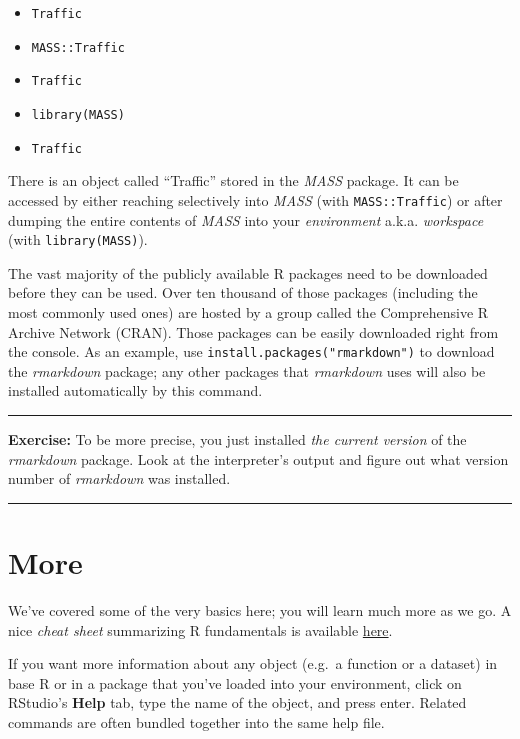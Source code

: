 \documentclass[]{book}
\providecommand{\tightlist}{%
  \setlength{\itemsep}{0pt}\setlength{\parskip}{0pt}}
\theoremstyle{definition}
\theoremstyle{definition}
\theoremstyle{definition}
\theoremstyle{remark}
\begin{document}
\begin{itemize}
\tightlist
\item
  \texttt{Traffic}
\item
  \texttt{MASS::Traffic}
\item
  \texttt{Traffic}
\item
  \texttt{library(MASS)}
\item
  \texttt{Traffic}
\end{itemize}

There is an object called ``Traffic'' stored in the \emph{MASS} package.
It can be accessed by either reaching selectively into \emph{MASS} (with
\texttt{MASS::Traffic}) or after dumping the entire contents of
\emph{MASS} into your \emph{environment} a.k.a. \emph{workspace} (with
\texttt{library(MASS)}).

The vast majority of the publicly available R packages need to be
downloaded before they can be used. Over ten thousand of those packages
(including the most commonly used ones) are hosted by a group called the
Comprehensive R Archive Network (CRAN). Those packages can be easily
downloaded right from the console. As an example, use
\texttt{install.packages("rmarkdown")} to download the \emph{rmarkdown}
package; any other packages that \emph{rmarkdown} uses will also be
installed automatically by this command.

\begin{center}\rule{0.5\linewidth}{\linethickness}\end{center}

\textbf{Exercise:} To be more precise, you just installed \emph{the
current version} of the \emph{rmarkdown} package. Look at the
interpreter's output and figure out what version number of
\emph{rmarkdown} was installed.

\begin{center}\rule{0.5\linewidth}{\linethickness}\end{center}

\hypertarget{more}{%
\section{More}\label{more}}

We've covered some of the very basics here; you will learn much more as
we go. A nice \emph{cheat sheet} summarizing R fundamentals is available
\href{http://github.com/rstudio/cheatsheets/raw/master/base-r.pdf}{here}.

If you want more information about any object (e.g.~a function or a
dataset) in base R or in a package that you've loaded into your
environment, click on RStudio's \textbf{Help} tab, type the name of the
object, and press enter. Related commands are often bundled together
into the same help file.
\end{document}
